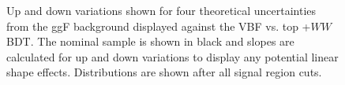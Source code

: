 \begin{figure}[!h]
  \hfill
  \hfill
  \hfill
  \hfill
{\caption{Up and down variations shown for four theoretical uncertainties from the ggF background displayed against the VBF vs. top +$WW$ BDT. The nominal sample is shown in black and slopes are calculated for up and down variations to display any potential linear shape effects. Distributions are shown after all signal region cuts.
\label{fig:ggftheor}}}
\end{figure}

